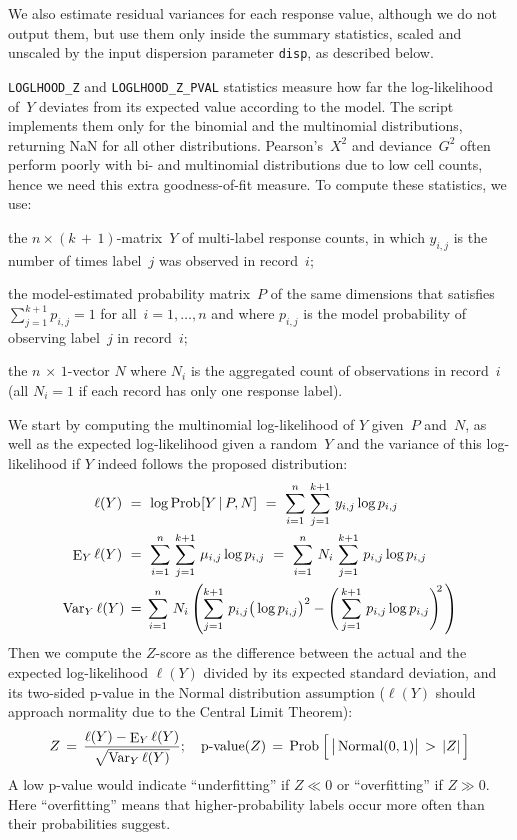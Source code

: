 We also estimate residual variances for each response value, although we do not output them,
but use them only inside the summary statistics, scaled and unscaled by the input dispersion
parameter {\tt disp}, as described below.

\smallskip
{\tt LOGLHOOD\_Z} and {\tt LOGLHOOD\_Z\_PVAL} statistics measure how far the log-likelihood
of~$Y$ deviates from its expected value according to the model.  The script implements them
only for the binomial and the multinomial distributions, returning NaN for all other distributions.
Pearson's~$X^2$ and deviance~$G^2$ often perform poorly with bi- and multinomial distributions
due to low cell counts, hence we need this extra goodness-of-fit measure.  To compute these
statistics, we use:
\begin{Itemize}
\item the $n\times (k\,{+}\,1)$-matrix~$Y$ of multi-label response counts, in which $y_{i,j}$
is the number of times label~$j$ was observed in record~$i$;
\item the model-estimated probability matrix~$P$ of the same dimensions that satisfies
$\sum_{j=1}^{k+1} p_{i,j} = 1$ for all~$i=1,\ldots,n$ and where $p_{i,j}$ is the model
probability of observing label~$j$ in record~$i$;
\item the $n\,{\times}\,1$-vector $N$ where $N_i$ is the aggregated count of observations
in record~$i$ (all $N_i = 1$ if each record has only one response label).
\end{Itemize}
We start by computing the multinomial log-likelihood of $Y$ given~$P$ and~$N$, as well as
the expected log-likelihood given a random~$Y$ and the variance of this log-likelihood if
$Y$ indeed follows the proposed distribution:
\begin{align*}
\ell (Y) \,\,&=\,\, \log \mathop{\mathrm{Prob}\hspace{0.5pt}}\nolimits[Y \,|\, P, N] \,\,=\,\, \sum_{i=1}^{n} \,\sum_{j=1}^{k+1}  \,y_{i,j}\log p_{i,j} \\
\mathop{\mathrm{E}}\nolimits_Y \ell (Y)  \,\,&=\,\, \sum_{i=1}^{n}\, \sum_{j=1}^{k+1} \,\mu_{i,j} \log p_{i,j} 
    \,\,=\,\, \sum_{i=1}^{n}\, N_i \,\sum_{j=1}^{k+1} \,p_{i,j} \log p_{i,j} \\
\mathop{\mathrm{Var}}\nolimits_Y \ell (Y) \,&=\, \sum_{i=1}^{n} \,N_i \left(\sum_{j=1}^{k+1} \,p_{i,j} \big(\log p_{i,j}\big)^2
    - \Bigg( \sum_{j=1}^{k+1} \,p_{i,j} \log p_{i,j}\Bigg) ^ {\!\!2\,} \right)
\end{align*}
Then we compute the $Z$-score as the difference between the actual and the expected
log-likelihood $\ell(Y)$ divided by its expected standard deviation, and its two-sided
p-value in the Normal distribution assumption ($\ell(Y)$ should approach normality due
to the Central Limit Theorem):
\begin{equation*}
Z   \,=\, \frac {\ell(Y) - \mathop{\mathrm{E}}\nolimits_Y \ell(Y)}{\sqrt{\mathop{\mathrm{Var}}\nolimits_Y \ell(Y)}};\quad
\mathop{\textrm{p-value}}(Z) \,=\, \mathop{\mathrm{Prob}\hspace{0.5pt}}\nolimits \Big[\,\big|\mathop{\textrm{Normal}}(0,1)\big| \, > \, |Z|\,\Big]
\end{equation*}
A low p-value would indicate ``underfitting'' if $Z\ll 0$ or ``overfitting'' if $Z\gg 0$.  Here
``overfitting'' means that higher-probability labels occur more often than their probabilities
suggest.

